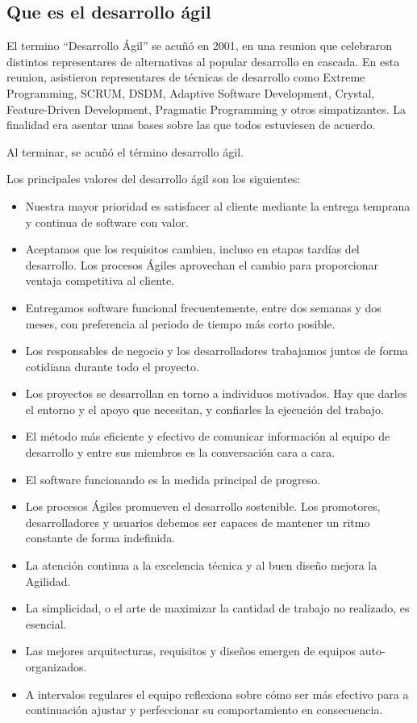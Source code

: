 \documentclass[12pt]{report} %
\begin{document}
\subsection{Que es el desarrollo ágil}


El termino ``Desarrollo Ágil'' se acuñó en 2001, en una reunion que celebraron
distintos representares de alternativas al popular desarrollo en cascada.  En
esta reunion, asistieron representares de técnicas de desarrollo como Extreme
Programming, SCRUM, DSDM, Adaptive Software Development, Crystal, Feature-Driven
Development, Pragmatic Programming y otros simpatizantes.  La finalidad era
asentar unas bases sobre las que todos estuviesen de acuerdo.

Al terminar, se acuñó el término desarrollo ágil.

Los principales valores del desarrollo ágil son los siguientes:
\cite{agilePrinciples}

\begin{itemize} 
  \item{Nuestra mayor prioridad es satisfacer al cliente mediante la entrega 
        temprana y continua de software con valor.} 
  \item{Aceptamos que los requisitos cambien, incluso en etapas tardías del 
        desarrollo. Los procesos Ágiles aprovechan el cambio para proporcionar 
        ventaja competitiva al cliente.} 
  \item{Entregamos software funcional frecuentemente, entre dos semanas y dos 
        meses, con preferencia al periodo de tiempo más corto posible.} 
  \item{Los responsables de negocio y los desarrolladores trabajamos juntos de 
        forma cotidiana durante todo el proyecto.} 
  \item{Los proyectos se desarrollan en torno a individuos motivados. Hay que 
        darles el entorno y el apoyo que necesitan, y confiarles la ejecución 
        del trabajo.} 
  \item{El método más eficiente y efectivo de comunicar información al equipo de
        desarrollo y entre sus miembros es la conversación cara a cara.} 
  \item{El software funcionando es la medida principal de progreso.}
  \item{Los procesos Ágiles promueven el desarrollo sostenible. Los promotores,
        desarrolladores y usuarios debemos ser capaces de mantener un ritmo
        constante de forma indefinida.} 
  \item{La atención continua a la excelencia técnica y al buen diseño mejora la 
        Agilidad.} 
  \item{La simplicidad, o el arte de maximizar la cantidad de trabajo no 
        realizado, es esencial.} 
  \item{Las mejores arquitecturas, requisitos y diseños emergen de equipos 
        auto-organizados.} 
  \item{A intervalos regulares el equipo reflexiona sobre cómo ser más efectivo 
        para a continuación ajustar y perfeccionar su comportamiento en 
        consecuencia.} 
\end{itemize}
\end{document}
